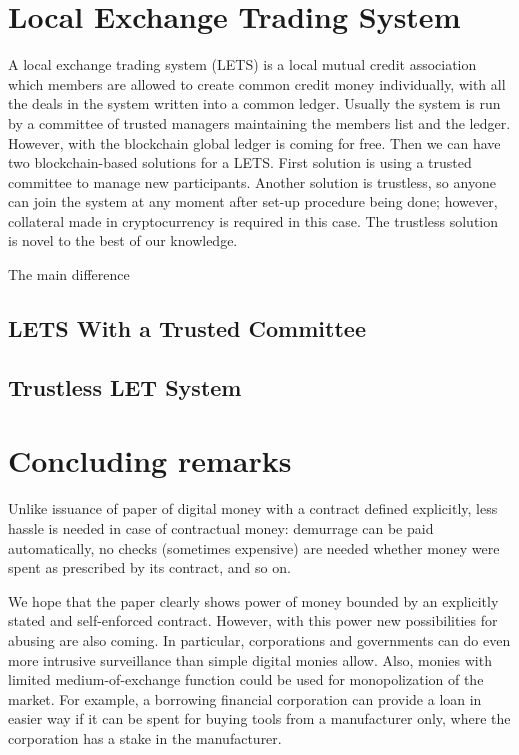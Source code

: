 \documentclass[]{llncs}   %
\begin{document}
\section{Local Exchange Trading System}
\label{sec-lets}

A local exchange trading system (LETS)\cite{???} is a local mutual credit association which members are allowed to create common credit money individually, with all the deals in the system written into a common ledger. Usually the system is run by a committee of 
trusted managers maintaining the members list and the ledger. However, with the blockchain global ledger is coming for free. Then 
we can have two blockchain-based solutions for a LETS. First solution is using a trusted committee to manage new participants. Another 
solution is trustless, so anyone can join the system at any moment after set-up procedure being done; however, collateral made in cryptocurrency is required in this case. The trustless solution is novel to the best of our knowledge.

The main difference

\subsection{LETS With a Trusted Committee}


\subsection{Trustless LET System}


\section{Concluding remarks}
\label{sec-conslusion}

Unlike issuance of paper of digital money with a contract defined explicitly, less hassle is needed in case of contractual money: demurrage can be paid automatically, no checks (sometimes expensive) are needed whether money were spent as prescribed 
by its contract, and so on. 

We hope that the paper clearly shows power of money bounded by an explicitly stated and self-enforced contract. However, with this power new possibilities for abusing are also coming. In particular, corporations and governments can do even more intrusive surveillance than simple digital monies allow.  Also, monies with limited medium-of-exchange function could be used for monopolization of the market. For example, a borrowing financial corporation can provide a loan in easier way if it can be spent for buying tools from a manufacturer only, where the corporation has a stake in the manufacturer.




\end{document}
